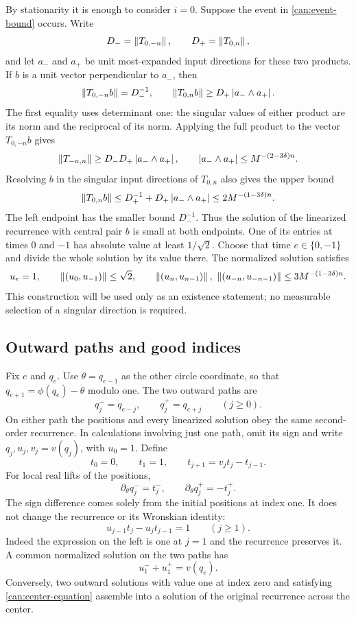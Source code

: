 By stationarity it is enough to consider $i=0$.  Suppose the event in
\cref{can:event-bound} occurs.  Write
\[
D_- = \left\lVert T_{0,-n}\right\rVert,\qquad D_+ = \left\lVert T_{0,n}\right\rVert,
\]
and let $a_-$ and $a_+$ be unit most-expanded input directions for these
two products.  If $b$ is a unit vector perpendicular to $a_-$, then
\[
\left\lVert T_{0,-n}b\right\rVert=D_-^{-1},\qquad
\left\lVert T_{0,n}b\right\rVert\ge D_+\left\lvert a_-\wedge a_+\right\rvert.
\]
The first equality uses determinant one: the singular values of either
product are its norm and the reciprocal of its norm.  Applying the full
product to the vector $T_{0,-n}b$ gives
\[
\left\lVert T_{-n,n}\right\rVert
\ge D_-D_+\left\lvert a_-\wedge a_+\right\rvert,
\qquad
\left\lvert a_-\wedge a_+\right\rvert\le M^{-(2-3\delta)n}.
\]
Resolving $b$ in the singular input directions of $T_{0,n}$ also gives the
upper bound
\[
\left\lVert T_{0,n}b\right\rVert
\le D_+^{-1}+D_+\left\lvert a_-\wedge a_+\right\rvert
\le 2M^{-(1-3\delta)n}.
\]
The left endpoint has the smaller bound $D_-^{-1}$.  Thus the solution
of the linearized recurrence with central pair $b$ is small at both
endpoints.  One of its entries at times $0$ and $-1$ has absolute value
at least $1/\sqrt2$.  Choose that time $e\in\{0,-1\}$ and divide the
whole solution by its value there.  The normalized solution satisfies
\begin{equation}\label{can:small-solution}
u_e=1,\qquad \left\lVert(u_0,u_{-1})\right\rVert\le\sqrt2,\qquad
\left\lVert(u_n,u_{n-1})\right\rVert,\ \left\lVert(u_{-n},u_{-n-1})\right\rVert
\le 3M^{-(1-3\delta)n}.
\end{equation}
This construction will be used only as an existence statement; no
measurable selection of a singular direction is required.

\subsection{Outward paths and good indices}

Fix $e$ and $q_e$.  Use $\theta=q_{e-1}$ as the other circle coordinate,
so that $q_{e+1}=\phi(q_e)-\theta$ modulo one.  The two outward paths are
\[
q_j^-=q_{e-j},\qquad q_j^+=q_{e+j}\qquad(j\ge0).
\]
On either path the positions and every linearized solution obey the same
second-order recurrence.  In calculations involving just one path, omit
its sign and write $q_j,u_j,v_j=v(q_j)$, with $u_0=1$.  Define
\begin{equation}\label{can:t-definition}
t_0=0,\qquad t_1=1,\qquad t_{j+1}=v_jt_j-t_{j-1}.
\end{equation}
For local real lifts of the positions,
\[
\partial_\theta q_j^-=t_j^-,\qquad
\partial_\theta q_j^+=-t_j^+.
\]
The sign difference comes solely from the initial positions at index one.
It does not change the recurrence or its Wronskian identity:
\begin{equation}\label{can:wronskian}
u_{j-1}t_j-u_jt_{j-1}=1\qquad(j\ge1).
\end{equation}
Indeed the expression on the left is one at $j=1$ and the recurrence
preserves it.  A common normalized solution on the two paths has
\begin{equation}\label{can:center-equation}
u_1^-+u_1^+=v(q_e).
\end{equation}
Conversely, two outward solutions with value one at index zero and
satisfying \cref{can:center-equation} assemble into a solution of the
original recurrence across the center.

